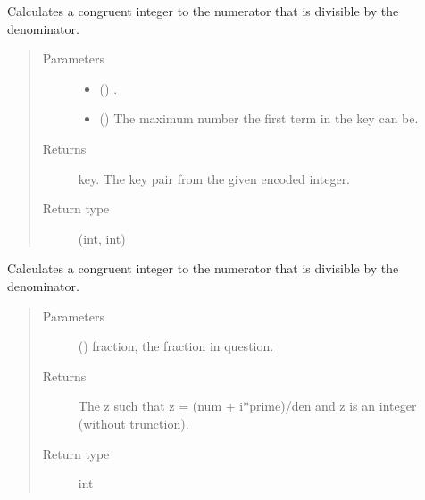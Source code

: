 \documentclass[letterpaper,10pt,english]{sphinxmanual}
\begin{document}

\begin{fulllineitems}
\label{\detokenize{index:Toolkit.data_to_key}}
Calculates a congruent integer to the numerator that is divisible by the denominator.
\begin{quote}\begin{description}
\item[{Parameters}] \leavevmode\begin{itemize}
\item {} 
 () \textendash{} 
.


\item {} 
 () \textendash{} The maximum number the first term in the key can be.

\end{itemize}

\item[{Returns}] \leavevmode
key. The key pair from the given encoded integer.

\item[{Return type}] \leavevmode
(int, int)

\end{description}\end{quote}

\end{fulllineitems}


\begin{fulllineitems}
\label{\detokenize{index:Toolkit.find_divisible_congruency}}
Calculates a congruent integer to the numerator that is divisible by the denominator.
\begin{quote}\begin{description}
\item[{Parameters}] \leavevmode
{} () \textendash{} fraction, the fraction in question.

\item[{Returns}] \leavevmode
The z such that z = (num + i*prime)/den and z is an integer (without trunction).

\item[{Return type}] \leavevmode
int

\end{description}\end{quote}

\end{fulllineitems}
\end{document}
